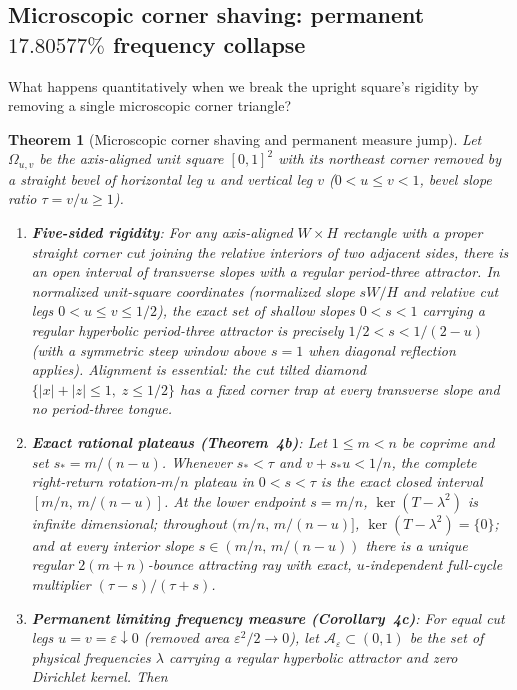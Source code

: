 \documentclass[11pt,reqno]{amsart}
\newtheorem{theorem}{Theorem}[section]
\theoremstyle{definition}
\theoremstyle{remark}
\begin{document}
\subsection{Microscopic corner shaving: permanent \texorpdfstring{$17.80577\%$}{17.80577 percent} frequency collapse}
What happens quantitatively when we break the upright square's rigidity by removing a single microscopic corner triangle?

\begin{theorem}[Microscopic corner shaving and permanent measure jump]\label{thm:shaving}
Let $\Omega_{u,v}$ be the axis-aligned unit square $[0,1]^2$ with its northeast corner removed by a straight bevel of horizontal leg $u$ and vertical leg $v$ ($0 < u \le v < 1$, bevel slope ratio $\tau = v/u \ge 1$).
\begin{enumerate}
  \item \textbf{Five-sided rigidity}: For any axis-aligned $W\times H$ rectangle with a proper straight corner cut joining the relative interiors of two adjacent sides, there is an open interval of transverse slopes with a regular period-three attractor. In normalized unit-square coordinates (normalized slope $sW/H$ and relative cut legs $0 < u \le v \le 1/2$), the exact set of \emph{shallow} slopes $0 < s < 1$ carrying a regular hyperbolic period-three attractor is precisely $1/2 < s < 1/(2-u)$ (with a symmetric steep window above $s = 1$ when diagonal reflection applies). Alignment is essential: the cut tilted diamond $\{|x|+|z| \le 1,\; z \le 1/2\}$ has a fixed corner trap at every transverse slope and no period-three tongue.
  \item \textbf{Exact rational plateaus (Theorem~4b)}: Let $1 \le m < n$ be coprime and set $s_* = m/(n-u)$. Whenever $s_* < \tau$ and $v + s_* u < 1/n$, the complete right-return rotation-$m/n$ plateau in $0 < s < \tau$ is the exact closed interval $[m/n,\, m/(n-u)]$. At the lower endpoint $s = m/n$, $\ker(T - \lambda^2)$ is infinite dimensional; throughout $(m/n,\, m/(n-u)]$, $\ker(T - \lambda^2) = \{0\}$; and at every interior slope $s \in (m/n,\, m/(n-u))$ there is a unique regular $2(m+n)$-bounce attracting ray with exact, $u$-independent full-cycle multiplier $(\tau - s)/(\tau + s)$.
  \item \textbf{Permanent limiting frequency measure (Corollary~4c)}: For equal cut legs $u = v = \varepsilon \downarrow 0$ (removed area $\varepsilon^2/2 \to 0$), let $\mathcal{A}_\varepsilon \subset (0,1)$ be the set of physical frequencies $\lambda$ carrying a regular hyperbolic attractor and zero Dirichlet kernel. Then

\end{enumerate}
\end{theorem}
\end{document}
